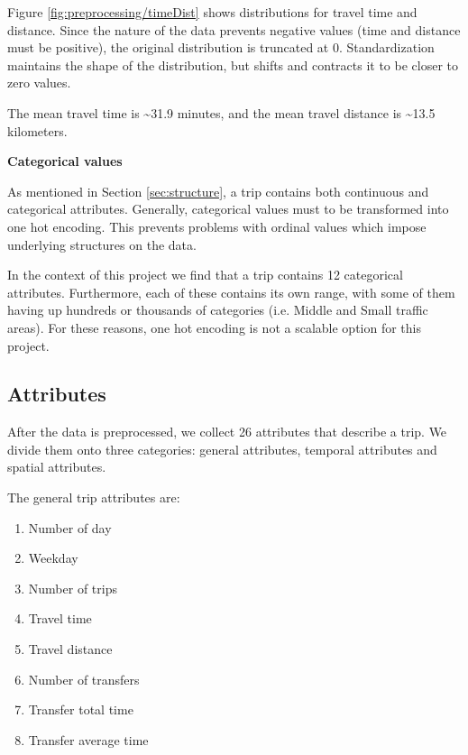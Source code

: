 \documentclass{article}
\begin{document}
Figure \ref{fig:preprocessing/timeDist} shows distributions for travel time and distance. Since the nature of the data prevents negative values (time and distance must be positive), the original distribution is truncated at 0. Standardization maintains the shape of the distribution, but shifts and contracts it to be closer to zero values.

The mean travel time is \textasciitilde 31.9 minutes, and the mean travel distance is \textasciitilde 13.5 kilometers.  %


\textbf{Categorical values}

As mentioned in Section \ref{sec:structure}, a trip contains both continuous and categorical attributes. Generally, categorical values must to be transformed into one hot encoding. This prevents problems with ordinal values which impose underlying structures on the data.

In the context of this project we find that a trip contains 12 categorical attributes. Furthermore, each of these contains its own range, with some of them having up hundreds or thousands of categories (i.e. Middle and Small traffic areas). For these reasons, one hot encoding is not a scalable option for this project.


\subsection{Attributes}
\label{sec:attributes}
After the data is preprocessed, we collect 26 attributes that describe a trip. We divide them onto three categories: general attributes, temporal attributes and spatial attributes. 

The general trip attributes are: 

\begin{enumerate}
\item Number of day
\item Weekday
\item Number of trips
\item Travel time
\item Travel distance
\item Number of transfers
\item Transfer total time
\item Transfer average time
\end{enumerate}
\end{document}
